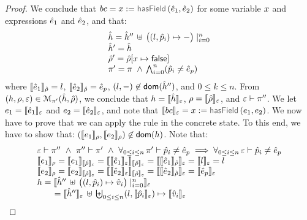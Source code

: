 \begin{proof}
\noindent{}
We conclude that  $\bcmd = \jvar := \hasfield(\sexpr_1, \sexpr_2)$ for some variable $\jvar$ and expressions $\sexpr_1$ and $\sexpr_2$, and that: 
$$
\begin{array}{l}
  \sheap =  \sheap'' \, \uplus \, \big((l, \sexprp_i) \mapsto -\big)\mid_{i = 0}^n      \\
  \sheap' =  \sheap \\
  \sstore' = \sstore[\jvar \mapsto \jfalse] \\ 
     \pc' = \pc \ \wedge \,  \bigwedge_{i = 0}^n (\sexprp_i \neq \sexpr_p) 
\end{array}
$$ 
where $\symbeval{\sexpr_1}{\sstore} =  \loc$, $\symbeval{\sexpr_2}{\sstore} =  \sexpr_p$, 
$(\loc, -) \not\in \domain(\sheap'')$, and $0 \leq k \leq n$. 
%
From $(\heap, \store, \senv) \in \smodels{\sheap, \sstore}{\pc'}$, we conclude that $\heap = \semexpr{\sheap}{\senv}$, $\store = \semexpr{\sstore}{\senv}$, and 
$\senv \vdash \pc''$. 
We let $\jsilexpr_1 = \symbeval{\sexpr_1}{\senv}$ and  
$\jsilexpr_2 = \symbeval{\sexpr_2}{\senv}$, and note that $\symbeval{\bcmd}{\senv} = \jvar := \hasfield(\jsilexpr_1, \jsilexpr_2)$.
We now have to prove that we can apply the  rule in the concrete state.
To this end, we have to show that: $(\symbeval{\jsilexpr_1}{\store}, \symbeval{\jsilexpr_2}{\store}) \not\in \domain(\heap)$. 
Note that: 
$$
\begin{array}{l}
%
\senv \vdash \pc'' \ \wedge \ \pc'' \vdash \pc' \ \wedge \ \forall_{0 \leq i \leq n}  \, \pc' \vdash \sexprp_i \neq \sexpr_p  
      \implies \forall_{0 \leq i \leq n}  \, \senv \vdash \sexprp_i \neq \sexpr_p  \\
%
 \symbeval{\jsilexpr_1}{\store} = \symbeval{\jsilexpr_1}{\symbeval{\sstore}{\senv}} = \symbeval{\symbeval{\sexpr_1}{\senv}}{\symbeval{\sstore}{\senv}} = \symbeval{\symbeval{\sexpr_1}{\sstore}}{\senv} 
    = \symbeval{\loc}{\senv} = \loc \\ 
  \symbeval{\jsilexpr_2}{\store}  = \symbeval{\jsilexpr_2}{\semexpr{\sstore}{\senv}} =  \symbeval{\symbeval{\sexpr_2}{\senv}}{\symbeval{\sstore}{\senv}} = \symbeval{\symbeval{\sexpr_2}{\sstore}}{\senv}
   =  \symbeval{\sexpr_p}{\senv} \\
 \heap = \semexpr{\sheap'' \, \uplus \, \big((l, \sexprp_i) \mapsto \sexprv_i\big)\mid_{i = 0}^n}{\senv} \\
    \qquad = \semexpr{\sheap''}{\senv} \dunion \biguplus_{0 \leq i \leq n} (l, \semexpr{\sexprp_i}{\senv}) \mapsto \semexpr{\sexprv_i}{\senv}

\end{array}$$
\end{proof}
